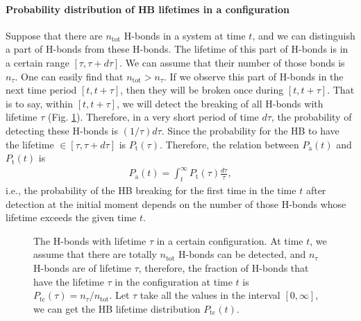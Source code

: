 {\paragraph{Probability distribution of HB lifetimes in a configuration}\label{P_tc}
Suppose that there are $n_\text{tot}$ H-bonds in a system at time $t$, and we can distinguish a part of H-bonds from these H-bonds. 
The lifetime of this part of H-bonds is in a certain range $[\tau, \tau + d\tau]$. We can assume that their number of those bonds is $n_\tau$. 
One can easily find that $n_\text{tot}>n_\tau$. If we observe this part of H-bonds in the next time period $[t, t+\tau]$, 
then they will be broken once during $[t, t+\tau]$. 
That is to say, within $[t,t+\tau]$, we will detect the breaking of all H-bonds with lifetime $\tau$ (Fig. \ref{fig:P_tc}).  
Therefore, in a very short period of time $d\tau$, the probability of detecting these H-bonds is $(1/\tau)d\tau$.
Since the probability for the HB to have the lifetime $\in [\tau,\tau+d\tau]$ is $P_\text{t}(\tau)$. 
Therefore, the relation between $P_\text{a}(t)$ and $P_\text{t}(t)$ is
\begin{eqnarray}
P_\text{a}(t) = \int_t^\infty P_\text{t}(\tau)\frac{d\tau}{\tau},
\label{eq:Pt_and_P}
\end{eqnarray}
i.e., the probability of the HB breaking for the first time in the time $t$ after detection at the initial moment depends on 
the number of those H-bonds whose lifetime exceeds the given time $t$\cite{Voloshin2009}.
\begin{figure}
\centering
{}
  \caption{\label{fig:P_tc} The H-bonds with lifetime $\tau$ in a certain configuration. 
At time $t$, we assume that there are totally $n_\text{tot}$ H-bonds can be detected, and $n_{\tau}$ H-bonds are of lifetime $\tau$, therefore,  the fraction of H-bonds that 
have the lifetime $\tau$ in the configuration at time $t$ is $P_\text{tc}(\tau) =  n_{\tau} /n_\text{tot}$.
Let $\tau$ take all the values in the interval $[0,\infty]$, we can get the HB lifetime distribution $P_\text{tc}(t)$.
}
\end{figure}

}
